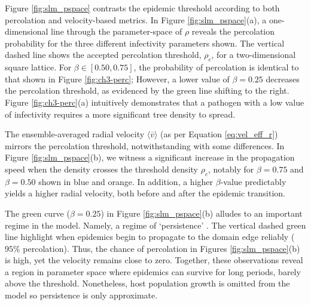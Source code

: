 Figure \ref{fig:slm_pspace} contrasts the epidemic threshold according to both percolation and velocity-based metrics.
In Figure \ref{fig:slm_pspace}(a), a one-dimensional line through the parameter-space of $\rho$ reveals the percolation probability for the three different infectivity parameters shown.
The vertical dashed line shows the accepted percolation threshold, $\rho_c$, for a two-dimensional square lattice. 
For $\beta \in [0.50, 0.75]$, the probability of percolation is identical to that shown in Figure \ref{fig:ch3-perc};
However, a lower value of $\beta = 0.25$ decreases the percolation threshold, as evidenced by the green line shifting to the right.
Figure \ref{fig:ch3-perc}(a) intuitively demonstrates that a pathogen with a low value of infectivity requires a more significant tree density to spread.

The ensemble-averaged radial velocity $\big\langle \overline{v} \big\rangle$ (as per Equation \ref{eq:vel_eff_r}) mirrors the percolation threshold,
notwithstanding with some differences.
In Figure \ref{fig:slm_pspace}(b), we witness a significant increase in the propagation speed when the density crosses the threshold density $\rho_c$, 
notably for $\beta=0.75$ and $\beta=0.50$ shown in blue and orange. 
In addition, a higher $\beta$-value predictably yields a higher radial velocity, both before and after the epidemic transition.

The green curve ($\beta=0.25$) in Figure \ref{fig:slm_pspace}(b) alludes to an important regime in the model.
Namely, a regime of `persistence' \cite{gilligan2008epidemiological}.
The vertical dashed green line highlight when epidemics begin to propagate to the domain edge reliably ($95\%$ percolation).
Thus, the chance of percolation in Figures \ref{fig:slm_pspace}(b) is high, yet the velocity remains close to zero.
Together, these observations reveal a region in parameter space where epidemics can survive for long periods, barely above the threshold.
Nonetheless, host population growth is omitted from the model so persistence is only approximate.

